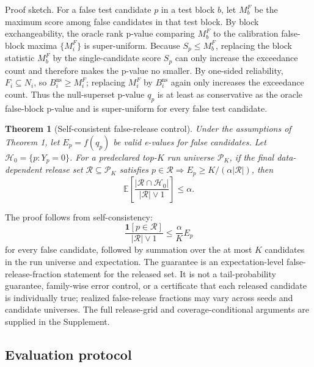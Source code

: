 \documentclass[10pt,twocolumn]{article}
\newtheorem{theorem}{Theorem}
\newcommand{\Pcal}{\mathcal P}
\newcommand{\Rcal}{\mathcal R}
\newcommand{\Hcal}{\mathcal H}
\newcommand{\E}{\mathbb E}
\newcommand{\ind}{\mathbf 1}
\begin{document}
Proof sketch.
For a false test candidate \(p\) in a test block \(b\), let \(M_b^F\) be the maximum score among false candidates in that test block.
By block exchangeability, the oracle rank p-value comparing \(M_b^F\) to the calibration false-block maxima \(\{M_i^F\}\) is super-uniform.
Because \(S_p\le M_b^F\), replacing the block statistic \(M_b^F\) by the single-candidate score \(S_p\) can only increase the exceedance count and therefore makes the p-value no smaller.
By one-sided reliability, \(F_i\subseteq N_i\), so \(B_i^{\mathrm{ns}}\ge M_i^F\); replacing \(M_i^F\) by \(B_i^{\mathrm{ns}}\) again only increases the exceedance count.
Thus the null-superset p-value \(q_p\) is at least as conservative as the oracle false-block p-value and is super-uniform for every false test candidate.

\begin{theorem}[Self-consistent false-release control]
Under the assumptions of Theorem 1, let \(E_p=f(q_p)\) be valid e-values for false candidates.
Let \(\Hcal_0=\{p:Y_p=0\}\).
For a predeclared top-\(K\) run universe \(\Pcal_K\), if the final data-dependent release set \(\Rcal\subseteq\Pcal_K\) satisfies \(p\in\Rcal\Rightarrow E_p\ge K/(\alpha|\Rcal|)\), then
\[
  \E\left[\frac{|\Rcal\cap\Hcal_0|}{|\Rcal|\vee1}\right]\le\alpha .
\]
\end{theorem}

The proof follows from self-consistency:
\[
  \frac{\ind[p\in\Rcal]}{|\Rcal|\vee1}\le \frac{\alpha}{K}E_p
\]
for every false candidate, followed by summation over the at most \(K\) candidates in the run universe and expectation.
The guarantee is an expectation-level false-release-fraction statement for the released set.
It is not a tail-probability guarantee, family-wise error control, or a certificate that each released candidate is individually true; realized false-release fractions may vary across seeds and candidate universes.
The full release-grid and coverage-conditional arguments are supplied in the Supplement.

\subsection{Evaluation protocol}
\end{document}

